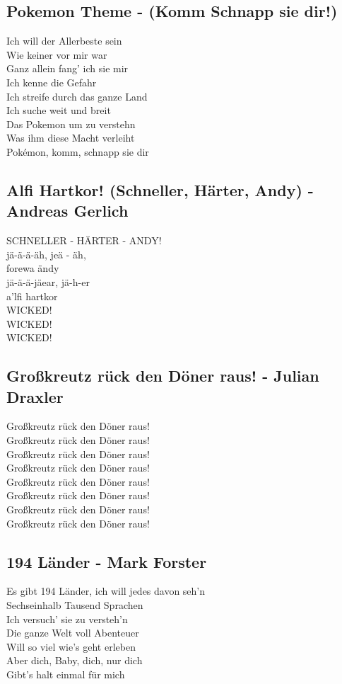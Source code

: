 \subsection{Pokemon Theme - (Komm Schnapp sie dir!)}
Ich will der Allerbeste sein\\
Wie keiner vor mir war\\
Ganz allein fang' ich sie mir\\
Ich kenne die Gefahr\\
Ich streife durch das ganze Land\\
Ich suche weit und breit\\
Das Pokemon um zu verstehn\\
Was ihm diese Macht verleiht\\
Pokémon, komm, schnapp sie dir\\
\newpage

\subsection{Alfi Hartkor! (Schneller, Härter, Andy) - Andreas Gerlich}
SCHNELLER - HÄRTER - ANDY!\\

jä-ä-ä-äh, jeä - äh,\\
forewa ändy\\
jä-ä-ä-jäear, jä-h-er\\
a'lfi hartkor\\

WICKED!\\
WICKED!\\
WICKED!\\
\newpage

\subsection{Großkreutz rück den Döner raus! -  Julian Draxler}
Großkreutz rück den Döner raus! \\
Großkreutz rück den Döner raus! \\
Großkreutz rück den Döner raus! \\
Großkreutz rück den Döner raus! \\
Großkreutz rück den Döner raus! \\
Großkreutz rück den Döner raus! \\
Großkreutz rück den Döner raus! \\
Großkreutz rück den Döner raus! \\
\newpage

\subsection{194 Länder - Mark Forster}
Es gibt 194 Länder, ich will jedes davon seh'n\\
Sechseinhalb Tausend Sprachen\\
Ich versuch' sie zu versteh'n\\
Die ganze Welt voll Abenteuer\\
Will so viel wie's geht erleben\\
Aber dich, Baby, dich, nur dich\\
Gibt's halt einmal für mich\\